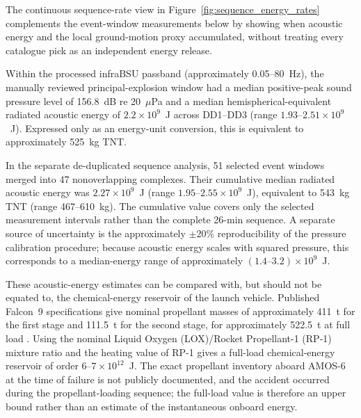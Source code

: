 \documentclass[]{seismica}
\begin{document}
The continuous sequence-rate view in
Figure~\ref{fig:sequence_energy_rates} complements the event-window
measurements below by showing when acoustic energy and the local ground-motion
proxy accumulated, without treating every catalogue pick as an independent
energy release.

Within the processed infraBSU passband (approximately 0.05--80~Hz), the
manually reviewed principal-explosion window had a median positive-peak sound
pressure level of 156.8~dB re 20~$\mu$Pa and a median
hemispherical-equivalent radiated acoustic energy of
$2.2\times10^9$~J across DD1--DD3
(range $1.93$--$2.51\times10^9$~J). Expressed only as an energy-unit
conversion, this is equivalent to approximately 525~kg TNT.

In the separate de-duplicated sequence analysis, 51 selected event windows
merged into 47 nonoverlapping complexes. Their cumulative median radiated
acoustic energy was $2.27\times10^9$~J
(range $1.95$--$2.55\times10^9$~J), equivalent to 543~kg TNT
(range 467--610~kg). The cumulative value covers only the selected
measurement intervals rather than the complete 26-min sequence. A separate
source of uncertainty is the approximately $\pm20\%$ reproducibility of the
pressure calibration procedure; because acoustic energy scales with squared
pressure, this corresponds to a median-energy range of approximately
$(1.4\text{--}3.2)\times10^9$~J.

These acoustic-energy estimates can be compared with, but should not be
equated to, the chemical-energy reservoir of the launch vehicle. Published
Falcon~9 specifications give nominal propellant masses of approximately
411~t for the first stage and 111.5~t for the second stage, for approximately
522.5~t at full load
\citep{falcon9_userguide_2015}. Using the nominal Liquid Oxygen (LOX)/Rocket 
Propellant-1 (RP-1) mixture ratio and the heating value of RP-1 gives a full-load 
chemical-energy reservoir of order
$6$--$7\times10^{12}$~J. The exact propellant inventory aboard AMOS-6 at the
time of failure is not publicly documented, and the accident occurred during
the propellant-loading sequence; the full-load value is therefore an upper
bound rather than an estimate of the instantaneous onboard energy.
\end{document}
